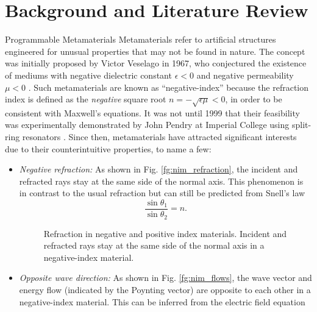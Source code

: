 
\graphicspath{{assets/chapter_2/}}

\chapter{Background and Literature Review}\label{ch:background}

\begin{section}{}
	\begin{subsection}{Programmable Metamaterials}
		Metamaterials refer to artificial structures engineered for unusual properties that may not be found in nature.
		The concept was initially proposed by Victor Veselago in 1967, who conjectured the existence of mediums with negative dielectric constant $\epsilon < 0$ and negative permeability $\mu < 0$ \cite{Veselago1968}.
		Such metamaterials are known as ``negative-index'' because the refraction index is defined as the \emph{negative} square root $n = - \sqrt{\epsilon \mu} < 0$, in order to be consistent with Maxwell's equations.
		It was not until 1999 that their feasibility was experimentally demonstrated by John Pendry at Imperial College using split-ring resonators \cite{Pendry1999}.
		Since then, metamaterials have attracted significant interests due to their counterintuitive properties, to name a few:
		\begin{itemize}
			\item \emph{Negative refraction:} As shown in Fig. \ref{fg:nim_refraction}, the incident and refracted rays stay at the same side of the normal axis. This phenomenon is in contrast to the usual refraction but can still be predicted from Snell's law
			\begin{equation}
				\frac{\sin \theta_1}{\sin \theta_2} = n.
			\end{equation}
			\begin{figure}[H]
				\centering
				\caption{Refraction in negative and positive index materials. Incident and refracted rays stay at the same side of the normal axis in a negative-index material.}
			\end{figure}
			\item \emph{Opposite wave direction:} As shown in Fig. \ref{fg:nim_flows}, the wave vector and energy flow (indicated by the Poynting vector) are opposite to each other in a negative-index material. This can be inferred from the electric field equation

\end{itemize}
\end{subsection}
\end{section}
